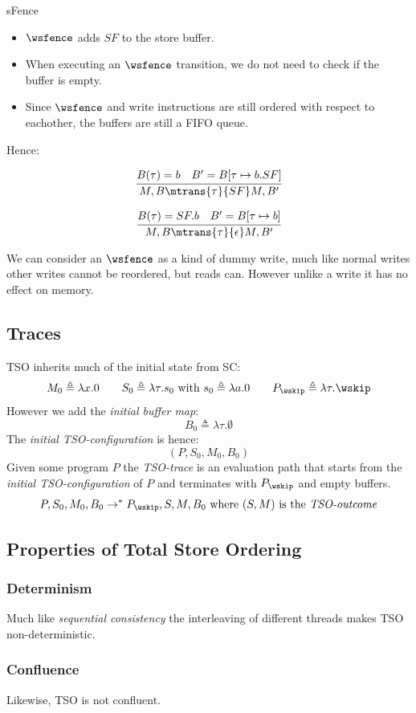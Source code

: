 \begin{examplebox}{sFence}
	\begin{itemize}
		\item $\wsfence$ adds $SF$ to the store buffer.
		\item When executing an $\wsfence$ transition, we do not need to check if the buffer is empty.
		\item Since $\wsfence$ and write instructions are still ordered with respect to eachother, the buffers are still a FIFO queue.
	\end{itemize}
	Hence:
	\\ \begin{minipage}{.5\textwidth}
		\[\cfrac{
				B(\tau) = b \quad B' = B[\tau \mapsto b.SF]
			}{
				M, B \mtrans{\tau}{SF} M, B'
			}\]
	\end{minipage}
	\begin{minipage}{.5\textwidth}
		\[\cfrac{
				B(\tau) = SF.b \quad B' = B[\tau \mapsto b]
			}{
				M, B \mtrans{\tau}{\epsilon} M, B'
			}\]
	\end{minipage}
	We can consider an $\wsfence$ as a kind of dummy write, much like normal writes other writes cannot be reordered, but reads can. However unlike a write it has no effect on memory.
\end{examplebox}

\subsection{Traces}
TSO inherits much of the initial state from SC:
\[M_0 \triangleq \lambda x . 0 \qquad S_0 \triangleq \lambda \tau . s_0 \text{ with } s_0 \triangleq \lambda a . 0 \qquad P_{\wskip} \triangleq \lambda \tau. \wskip\]
However we add the \textit{initial buffer map}:
\[B_0 \triangleq \lambda \tau . \emptyset\]
The \textit{initial TSO-configuration} is hence:
\[(P, S_0, M_0, B_0)\]
Given some program $P$ the \textit{TSO-trace} is an evaluation path that starts from the \textit{initial TSO-configuration} of $P$ and terminates with $P_{\wskip}$ and empty buffers.
\[P, S_0, M_0, B_0 \to^* P_{\wskip}, S, M, B_0 \text{ where } (S, M) \text{ is the \textit{TSO-outcome}}\]

\subsection{Properties of Total Store Ordering}
\subsubsection{Determinism}
Much like \textit{sequential consistency} the interleaving of different threads makes TSO non-deterministic.

\subsubsection{Confluence}
Likewise, TSO is not confluent.